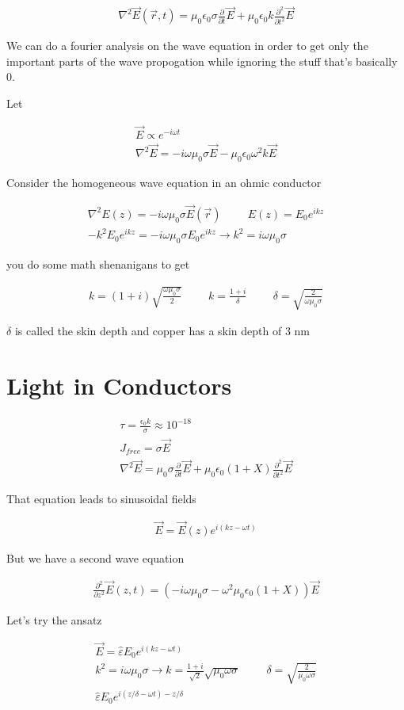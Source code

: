 \documentclass[fleqn]{report}
\newcommand{\hp}{\hspace{1cm}}
\newcommand{\del}{\partial}
\newcommand{\equations} [1] {
\begin{gather*}
#1
\end{gather*}
}
\begin{document}
\equations{
    \nabla^2 \vec E(\vec r, t)
    =
    \mu_0 \epsilon_0 \sigma \frac{\del}{\del t} \vec E
    +
    \mu_0 \epsilon_0 k \frac{\del^2}{\del t^2} \vec E 
}

We can do a fourier analysis on the wave equation in order to get only 
the important parts of the wave propogation while ignoring the stuff that's 
basically 0. 

Let 
\equations{
    \vec E \propto e^{-i \omega t}
    \\
    \nabla^2 \vec E 
    =
    - i \omega \mu_0 \sigma \vec E 
    -
    \mu_0 \epsilon_0 \omega^2 k \vec E 
}

Consider the homogeneous wave equation in an ohmic conductor 
\equations{
    \nabla^2 E(z) = - i \omega \mu_0 \sigma \vec E(\vec r)
    \hp 
    E(z) = E_0 e^{i k z}
    \\
    - k^2 E_0 e^{i k z} = - i \omega \mu_0 \sigma E_0 e^{ikz}
    \rightarrow 
    k^2 = i \omega \mu_0 \sigma
}

you do some math shenanigans to get 

\equations{
    k = (1 + i) \sqrt{\frac{\omega \mu_0 \sigma}{2}}
    \hp 
    k = \frac{1 + i}{\delta}
    \hp 
    \delta = \sqrt{\frac{2}{\omega \mu_0 \sigma}}
}

$\delta$ is called the skin depth and copper has a skin depth of 3 nm

\section{Light in Conductors}
\equations{
    \tau 
    =
    \frac{\epsilon_0 k}{\sigma }
    \approx 
    10^{-18}
    \\
    J_{free}
    =
    \sigma \vec E 
    \\
    \nabla^2 \vec E 
    =
    \mu_0 \sigma \frac{\del}{\del t}\vec E 
    +
    \mu_0 \epsilon_0 
    (1 + X)
    \frac{\del^2}{\del t^2} \vec E 
}

That equation leads to sinusoidal fields 
\equations{
    \vec E 
    =
    \vec E(z) e^{i (kz - \omega t)}
}

But we have a second wave equation 
\equations{
    \frac{\del^2}{\del z^2}
    \vec E(z, t)
    =
    \left(
        -i \omega \mu_0 \sigma 
        -
        \omega^2 \mu_0 \epsilon_0 (1 + X)
    \right)
    \vec E 
}

Let's try the ansatz 
\equations{
    \vec E 
    =
    \hat \varepsilon 
    E_0 
    e^{i(kz - \omega t)}
    \\
    k^2 = i \omega \mu_0 \sigma 
    \rightarrow 
    k 
    =
    \frac{1 + i}{\sqrt{2}}
    \sqrt{\mu_0 \omega \sigma}
    \hp 
    \delta 
    =
    \sqrt{\frac{2}{\mu_0 \omega \sigma}}
    \\
    \hat \varepsilon 
    E_0 
    e^{i(z/\delta - \omega t) - z / \delta}
}
\end{document}
